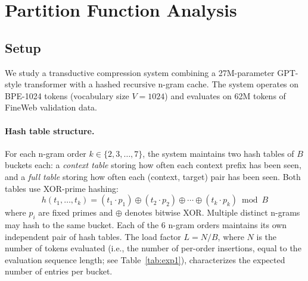 \documentclass[11pt]{article}
\begin{document}
\section{Partition Function Analysis}
\label{sec:theory}

\subsection{Setup}

We study a transductive compression system combining a 27M-parameter GPT-style transformer with a hashed recursive n-gram cache. The system operates on BPE-1024 tokens (vocabulary size $V = 1024$) and evaluates on 62M tokens of FineWeb validation data.

\paragraph{Hash table structure.} For each n-gram order $k \in \{2, 3, \ldots, 7\}$, the system maintains two hash tables of $B$ buckets each: a \emph{context table} storing how often each context prefix has been seen, and a \emph{full table} storing how often each (context, target) pair has been seen. Both tables use XOR-prime hashing:
\[
h(t_1, \ldots, t_k) = (t_1 \cdot p_1) \oplus (t_2 \cdot p_2) \oplus \cdots \oplus (t_k \cdot p_k) \bmod B
\]
where $p_i$ are fixed primes and $\oplus$ denotes bitwise XOR. Multiple distinct n-grams may hash to the same bucket. Each of the 6 n-gram orders maintains its own independent pair of hash tables. The load factor $L = N/B$, where $N$ is the number of tokens evaluated (i.e., the number of per-order insertions, equal to the evaluation sequence length; see Table~\ref{tab:exp1}), characterizes the expected number of entries per bucket.
\end{document}
